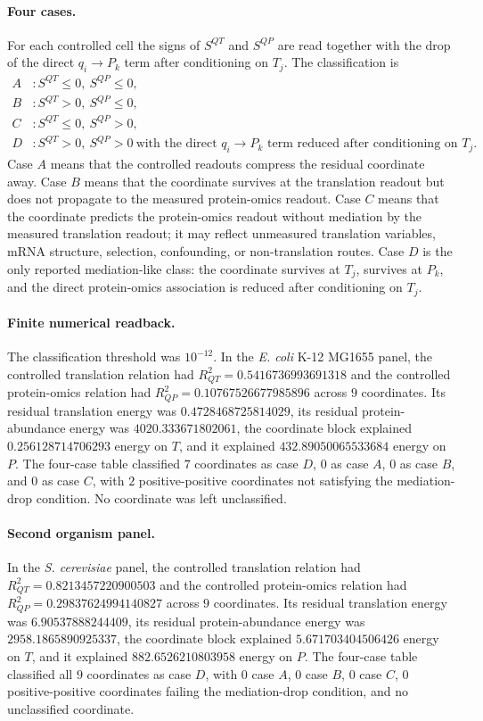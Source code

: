 \paragraph{Four cases.}
For each controlled cell the signs of $S^{QT}$ and $S^{QP}$ are read together with the drop of the direct $q_i\to P_k$ term after conditioning on $T_j$. The classification is
$$
\begin{aligned}
A &: S^{QT}\leq 0,\ S^{QP}\leq 0, \\
B &: S^{QT}>0,\ S^{QP}\leq 0, \\
C &: S^{QT}\leq 0,\ S^{QP}>0, \\
D &: S^{QT}>0,\ S^{QP}>0\ \text{with the direct }q_i\to P_k\text{ term reduced after conditioning on }T_j .
\end{aligned}
$$
Case $A$ means that the controlled readouts compress the residual coordinate away. Case $B$ means that the coordinate survives at the translation readout but does not propagate to the measured protein-omics readout. Case $C$ means that the coordinate predicts the protein-omics readout without mediation by the measured translation readout; it may reflect unmeasured translation variables, mRNA structure, selection, confounding, or non-translation routes. Case $D$ is the only reported mediation-like class: the coordinate survives at $T_j$, survives at $P_k$, and the direct protein-omics association is reduced after conditioning on $T_j$.

\paragraph{Finite numerical readback.}
The classification threshold was $10^{-12}$. In the \emph{E. coli} K-12 MG1655 panel, the controlled translation relation had $R^2_{QT}=0.5416736993691318$ and the controlled protein-omics relation had $R^2_{QP}=0.10767526677985896$ across $9$ coordinates. Its residual translation energy was $0.4728468725814029$, its residual protein-abundance energy was $4020.333671802061$, the coordinate block explained $0.256128714706293$ energy on $T$, and it explained $432.89050065533684$ energy on $P$. The four-case table classified $7$ coordinates as case $D$, $0$ as case $A$, $0$ as case $B$, and $0$ as case $C$, with $2$ positive-positive coordinates not satisfying the mediation-drop condition. No coordinate was left unclassified.

\paragraph{Second organism panel.}
In the \emph{S. cerevisiae} panel, the controlled translation relation had $R^2_{QT}=0.8213457220900503$ and the controlled protein-omics relation had $R^2_{QP}=0.29837624994140827$ across $9$ coordinates. Its residual translation energy was $6.90537888244409$, its residual protein-abundance energy was $2958.1865890925337$, the coordinate block explained $5.671703404506426$ energy on $T$, and it explained $882.6526210803958$ energy on $P$. The four-case table classified all $9$ coordinates as case $D$, with $0$ case $A$, $0$ case $B$, $0$ case $C$, $0$ positive-positive coordinates failing the mediation-drop condition, and no unclassified coordinate.

